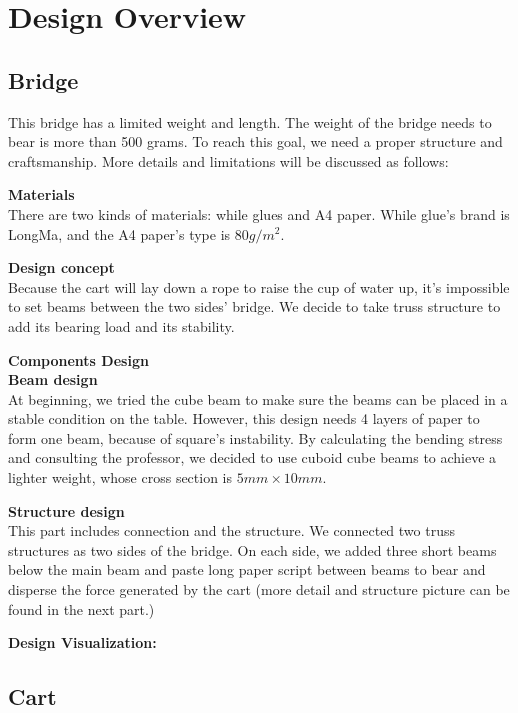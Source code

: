 \section{Design Overview}
\subsection{Bridge}
This bridge has a limited weight and length. The weight of the bridge needs to
bear is more than 500 grams. To reach this goal, we need a proper structure and
craftsmanship. More details and limitations will be discussed as follows: 

\bigskip
\noindent
\textbf{Materials} \\
\indent
There are two kinds of materials: while glues and A4 paper.
While glue's brand is LongMa, and the A4 paper’s type is 80$g/m^2$.

\bigskip
\noindent
\textbf{Design concept} \\
\indent
Because the cart will lay down a rope to raise the cup of water up, it’s
impossible to set beams between the two sides’ bridge. We decide to take truss
structure to add its bearing load and its stability.

 
\bigskip
\noindent
{\large\textbf{Components Design}} \\
\textbf{Beam design} \\
\indent
At beginning, we tried the cube beam to make sure the beams can be placed in a
stable condition on the table. However, this design needs 4 layers of paper to
form one beam, because of square’s instability. By calculating the bending
stress and consulting the professor, we decided to use cuboid cube beams to
achieve a lighter weight, whose cross section is $5mm\times10mm$. 


\bigskip
\noindent
\textbf{Structure design} \\
\indent
This part includes connection and the structure. We connected two truss
structures as two sides of the bridge. On each side, we added three short beams
below the main beam and paste long paper script between beams to bear and
disperse the force generated by the cart (more detail and structure picture can
be found in the next part.) 

\bigskip
\noindent
\textbf{Design Visualization:} \\
\indent




\subsection{Cart}

